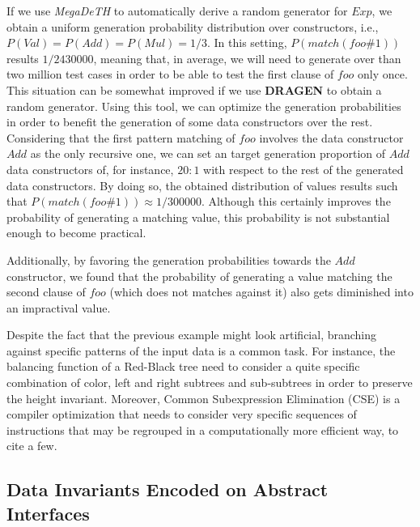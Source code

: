 \documentclass[conference, fleqn]{IEEEtran}
\newcommand{\Conid}[1]{\mathit{#1}}
\newcommand{\Varid}[1]{\mathit{#1}}
\newcommand{\megadeth}{\emph{MegaDeTH}\xspace}
\newcommand{\dragen}{\textbf{DRAGEN}\xspace}
\begin{document}
If we use \megadeth to automatically derive a random generator for \ensuremath{\Conid{Exp}}, we
obtain a uniform generation probability distribution over constructors, i.e.,
$P(\ensuremath{\Conid{Val}}) = P(\ensuremath{\Conid{Add}}) = P(\ensuremath{\Conid{Mul}}) = 1/3$.
%
In this setting, $P(match(foo\#1))$ results $1/2430000$, meaning that, in
average, we will need to generate over than two million test cases in order to
be able to test the first clause of \ensuremath{\Varid{foo}} only once.
%
This situation can be somewhat improved if we use \dragen to obtain a random
generator.
%
Using this tool, we can optimize the generation probabilities in order to
benefit the generation of some data constructors over the rest.
%
Considering that the first pattern matching of \ensuremath{\Varid{foo}} involves the data
constructor \ensuremath{\Conid{Add}} as the only recursive one, we can set an target generation
proportion of \ensuremath{\Conid{Add}} data constructors of, for instance, $20:1$ with respect to
the rest of the generated data constructors.
%
By doing so, the obtained distribution of values results such that
$P(match(foo\#1)) \approx 1/300000$.
%
Although this certainly improves the probability of generating a matching value,
this probability is not substantial enough to become practical.


Additionally, by favoring the generation probabilities towards the \ensuremath{\Conid{Add}}
constructor, we found that the probability of generating a value matching the
second clause of \ensuremath{\Varid{foo}} (which does not matches against it) also gets diminished
into an impractival value.


Despite the fact that the previous example might look artificial, branching
against specific patterns of the input data is a common task.
%
For instance, the balancing function of a Red-Black tree need to consider a
quite specific combination of color, left and right subtrees and sub-subtrees
in order to preserve the height invariant.
%
Moreover, Common Subexpression Elimination (CSE) is a compiler optimization that
needs to consider very specific sequences of instructions that may be regrouped
in a computationally more efficient way, to cite a few.



\subsection{\textbf{Data Invariants Encoded on Abstract Interfaces}}
\end{document}
